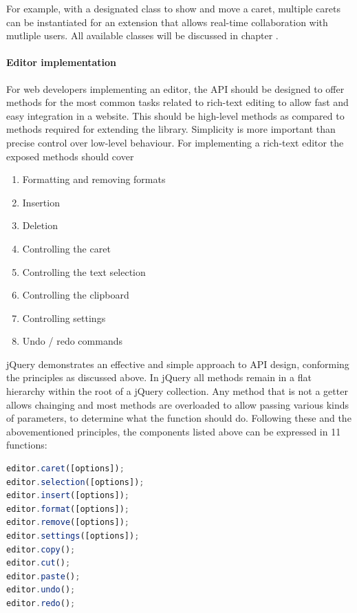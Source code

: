For example, with a designated class to show and move a caret, multiple carets can be instantiated for an extension that allows real-time collaboration with mutliple users. All available classes will be discussed in chapter .

\paragraph{Editor implementation}

For web developers implementing an editor, the API should be designed to offer methods for the most common tasks related to rich-text editing to allow fast and easy integration in a website. This should be high-level methods as compared to methods required for extending the library. Simplicity is more important than precise control over low-level behaviour. For implementing a rich-text editor the exposed methods should cover

\begin{enumerate}
\item Formatting and removing formats
\item Insertion
\item Deletion
\item Controlling the caret
\item Controlling the text selection
\item Controlling the clipboard
\item Controlling settings
\item Undo / redo commands
\end{enumerate}

\noindent jQuery demonstrates an effective and simple approach to API design, conforming the principles as discussed above. In jQuery all methods remain in a flat hierarchy within the root of a jQuery collection. Any method that is not a getter allows chainging and most methods are overloaded to allow passing various kinds of parameters, to determine what the function should do. Following these and the abovementioned principles, the components listed above can be expressed in 11 functions:

\begin{lstlisting}[language=JavaScript, caption=API for implementing a rich-text editor, label=lst:rich_text_api]
editor.caret([options]);
editor.selection([options]);
editor.insert([options]);
editor.format([options]);
editor.remove([options]);
editor.settings([options]);
editor.copy();
editor.cut();
editor.paste();
editor.undo();
editor.redo();
\end{lstlisting}

